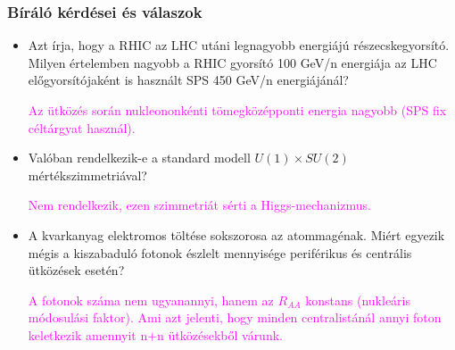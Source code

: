 \documentclass{beamer}
\begin{document}
\begin{frame}[noframenumbering]
\frametitle{Bíráló kérdései és válaszok}
\begin{itemize}
\item Azt írja, hogy a RHIC az LHC utáni legnagyobb energiájú részecskegyorsító. Milyen értelemben nagyobb a RHIC gyorsító 100 GeV/n energiája az LHC előgyorsítójaként is használt SPS 450 GeV/n energiájánál?

\textcolor{magenta}{Az ütközés során nukleononkénti tömegközépponti energia nagyobb (SPS fix céltárgyat használ).}

\item Valóban rendelkezik-e a standard modell $U(1)\times SU(2)$ mértékszimmetriával?

\textcolor{magenta}{Nem rendelkezik, ezen szimmetriát sérti a Higgs-mechanizmus.}

\item A kvarkanyag elektromos töltése sokszorosa az atommagénak. Miért egyezik mégis a kiszabaduló fotonok észlelt mennyisége periférikus és centrális ütközések esetén?

\textcolor{magenta}{A fotonok száma nem ugyanannyi, hanem az $R_{AA}$ konstans (nukleáris módosulási faktor). Ami azt jelenti, hogy minden centralistánál annyi foton keletkezik amennyit n+n ütközésekből várunk.}

\end{itemize}
\end{frame}
\end{document}
